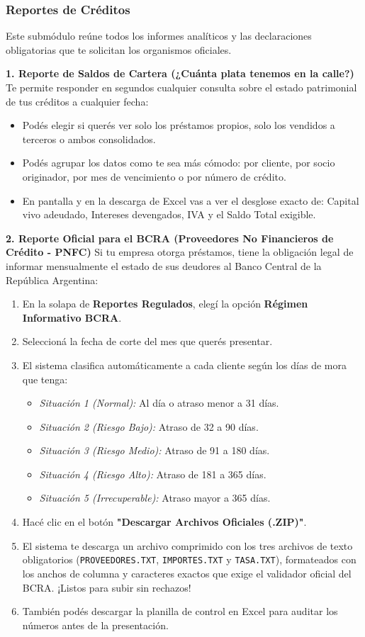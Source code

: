 \documentclass[12pt,a4paper]{article}
\renewcommand{\_}{\textunderscore\allowbreak}
\begin{document}
\subsubsection{Reportes de Créditos}
Este submódulo reúne todos los informes analíticos y las declaraciones obligatorias que te solicitan los organismos oficiales.

\textbf{1. Reporte de Saldos de Cartera (¿Cuánta plata tenemos en la calle?)}
Te permite responder en segundos cualquier consulta sobre el estado patrimonial de tus créditos a cualquier fecha:
\begin{itemize}
    \item Podés elegir si querés ver solo los préstamos propios, solo los vendidos a terceros o ambos consolidados.
    \item Podés agrupar los datos como te sea más cómodo: por cliente, por socio originador, por mes de vencimiento o por número de crédito.
    \item En pantalla y en la descarga de Excel vas a ver el desglose exacto de: Capital vivo adeudado, Intereses devengados, IVA y el Saldo Total exigible.
\end{itemize}

\textbf{2. Reporte Oficial para el BCRA (Proveedores No Financieros de Crédito - PNFC)}
Si tu empresa otorga préstamos, tiene la obligación legal de informar mensualmente el estado de sus deudores al Banco Central de la República Argentina:
\begin{enumerate}
    \item En la solapa de \textbf{Reportes Regulados}, elegí la opción \textbf{Régimen Informativo BCRA}.
    \item Seleccioná la fecha de corte del mes que querés presentar.
    \item El sistema clasifica automáticamente a cada cliente según los días de mora que tenga:
          \begin{itemize}
              \item \textit{Situación 1 (Normal):} Al día o atraso menor a 31 días.
              \item \textit{Situación 2 (Riesgo Bajo):} Atraso de 32 a 90 días.
              \item \textit{Situación 3 (Riesgo Medio):} Atraso de 91 a 180 días.
              \item \textit{Situación 4 (Riesgo Alto):} Atraso de 181 a 365 días.
              \item \textit{Situación 5 (Irrecuperable):} Atraso mayor a 365 días.
          \end{itemize}
    \item Hacé clic en el botón \textbf{"Descargar Archivos Oficiales (.ZIP)"}.
    \item El sistema te descarga un archivo comprimido con los tres archivos de texto obligatorios (\texttt{PROVEEDORES.TXT}, \texttt{IMPORTES.TXT} y \texttt{TASA.TXT}), formateados con los anchos de columna y caracteres exactos que exige el validador oficial del BCRA. ¡Listos para subir sin rechazos!
    \item También podés descargar la planilla de control en Excel para auditar los números antes de la presentación.
\end{enumerate}
\end{document}
